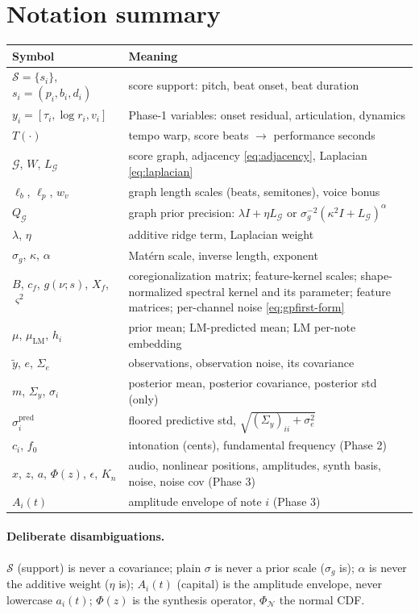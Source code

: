 \documentclass[11pt]{article}
\newcommand{\N}{\mathcal{N}}
\newcommand{\score}{\mathcal{S}}
\newcommand{\graph}{\mathcal{G}}
\newcommand{\Qg}{Q_{\graph}}
\newcommand{\Lg}{L_{\graph}}
\newcommand{\muLM}{\mu_{\mathrm{LM}}}
\begin{document}
\section{Notation summary}

\begin{center}
\begin{tabular}{ll}
\toprule
Symbol & Meaning \\
\midrule
$\score = \{s_i\}$, $s_i = (p_i, b_i, d_i)$ & score support: pitch, beat onset, beat duration \\
$y_i = [\tau_i, \log r_i, v_i]$ & Phase-1 variables: onset residual, articulation, dynamics \\
$T(\cdot)$ & tempo warp, score beats $\to$ performance seconds \\
$\graph$, $W$, $\Lg$ & score graph, adjacency \eqref{eq:adjacency}, Laplacian \eqref{eq:laplacian} \\
$\ell_b$, $\ell_p$, $w_v$ & graph length scales (beats, semitones), voice bonus \\
$\Qg$ & graph prior precision: $\lambda I + \eta \Lg$ or $\sigma_g^{-2}(\kappa^2 I + \Lg)^\alpha$ \\
$\lambda$, $\eta$ & additive ridge term, Laplacian weight \\
$\sigma_g$, $\kappa$, $\alpha$ & Mat\'ern scale, inverse length, exponent \\
$B$, $c_f$, $g(\nu; s)$, $X_f$, $\varsigma^2$ & coregionalization matrix; feature-kernel scales; shape-normalized spectral kernel and its parameter; feature matrices; per-channel noise \eqref{eq:gpfirst-form} \\
$\mu$, $\muLM$, $h_i$ & prior mean; LM-predicted mean; LM per-note embedding \\
$\tilde y$, $e$, $\Sigma_e$ & observations, observation noise, its covariance \\
$m$, $\Sigma_y$, $\sigma_i$ & posterior mean, posterior covariance, posterior std (only) \\
$\sigma_i^{\mathrm{pred}}$ & floored predictive std, $\sqrt{(\Sigma_y)_{ii} + \sigma_e^2}$ \\
$c_i$, $f_0$ & intonation (cents), fundamental frequency (Phase 2) \\
$x$, $z$, $a$, $\Phi(z)$, $\epsilon$, $K_n$ & audio, nonlinear positions, amplitudes, synth basis, noise, noise cov (Phase 3) \\
$A_i(t)$ & amplitude envelope of note $i$ (Phase 3) \\
\bottomrule
\end{tabular}
\end{center}

\paragraph{Deliberate disambiguations.}
$\score$ (support) is never a covariance; plain $\sigma$ is never a prior scale ($\sigma_g$
is); $\alpha$ is never the additive weight ($\eta$ is); $A_i(t)$ (capital) is the amplitude
envelope, never lowercase $a_i(t)$; $\Phi(z)$ is the synthesis operator, $\Phi_{\N}$ the
normal CDF.
\end{document}
